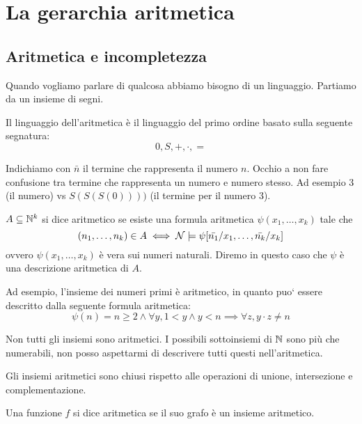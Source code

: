 \chapter{La gerarchia aritmetica}

\section{Aritmetica e incompletezza}

Quando vogliamo parlare di qualcosa abbiamo bisogno di un linguaggio. Partiamo da un insieme di
segni.

Il linguaggio dell'aritmetica è il linguaggio del primo ordine basato sulla
seguente segnatura:
\begin{equation*}
    0,S,+,\cdot,=
\end{equation*}

Indichiamo con $\bar{n}$ il termine che rappresenta il numero $n$. Occhio a non fare confusione tra
termine che rappresenta un numero e numero stesso. Ad esempio 3 (il numero) vs $S(S(S(0))))$ (il
termine per il numero 3).

\begin{defn}
    $A \subseteq \mathbb{N}^{k}$ si dice aritmetico se esiste una formula aritmetica
    $\psi(x_{1},\dotsc,x_{k})$ tale che
    \begin{equation*}
        (n_{1},\dotsc,n_{k}) \in A \iff \mathcal{N} \models \psi[\bar{n_{1}}/x_{1},\dotsc,\bar{n_{k}}/x_{k}]
    \end{equation*}
    ovvero $\psi(x_{1},\dotsc,x_{k})$ è vera sui numeri naturali. Diremo in questo caso che $\psi$ è una
    descrizione aritmetica di $A$.
\end{defn}

Ad esempio, l'insieme dei numeri primi è aritmetico, in quanto puo` essere
descritto dalla seguente formula aritmetica:
\begin{equation*}
    \psi(n) = n \geq 2 \land \forall y, 1 < y \land y < n \implies \forall z, y \cdot z \not= n
\end{equation*}

Non tutti gli insiemi sono aritmetici. I possibili sottoinsiemi di $\mathbb{N}$ sono più che numerabili,
non posso aspettarmi di descrivere tutti questi nell'aritmetica.

Gli insiemi aritmetici sono chiusi rispetto alle operazioni di unione, intersezione
e complementazione.

\begin{defn}
    Una funzione $f$ si dice aritmetica se il suo grafo è un insieme aritmetico.
\end{defn}

